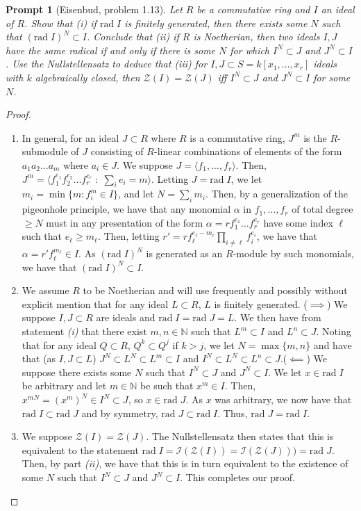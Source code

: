 \documentclass[english]{article}
\newcommand{\NN}{\mathbb{N}}
\newcommand{\prob}[1]{\setcounter{section}{#1-1}\section{}}
\newcommand{\prt}[1]{\setcounter{subsection}{#1-1}\subsection{}}
\newtheorem*{prompt*}{Prompt}
\theoremstyle{remark}
\theoremstyle{definition}
\newcommand{\rad}{\mathrm{rad}\;}
\newcommand{\gen}[1]{\langle #1 \rangle}
\newcommand{\genb}[2]{\langle #1\;:\;#2 \rangle}
\newcommand{\Ii}{\mathcal{I}}
\newcommand{\Zz}{\mathcal{Z}}
\begin{document}
\begin{prompt*}[Eisenbud, problem 1.13]
	Let $R$ be a commutative ring and $I$ an ideal of $R$. Show that \emph{(i)} if $\rad I$ is finitely generated, then there exists some $N$ such that $(\rad I)^N\subset I$. Conclude that \emph{(ii)} if $R$ is Noetherian, then two ideals $I, J$ have the same radical if and only if there is some $N$ for which $I^N\subset J$ and $J^N\subset I$. Use the Nullstellensatz to deduce that \emph{(iii)} for $I,J\subset S=k[x_1,\hdots,x_r]$ ideals with $k$ algebraically closed, then $\Zz(I)=\Zz(J)$ iff $I^N\subset J$ and $J^N\subset I$ for some $N$.\end{prompt*}
\begin{proof}
	\begin{enumerate}[label=\emph{(\roman*)}]
		\item In general, for an ideal $J\subset R$ where $R$ is a commutative ring, $J^m$ is the $R$-submodule of $J$ consisting of $R$-linear combinations of elements of the form $a_1a_2\hdots a_m$ where $a_i\in J$. We suppose $J=\gen{f_1,\hdots,f_r}$. Then, $J^m=\genb{f_1^{e_1}f_2^{e_2}\hdots f_r^{e_r}}{\sum_i e_i=m}$. Letting $J=\rad I$, we let $m_i= \min\{m:f_i^m\in I\}$, and let $N=\sum_i m_i$. Then, by a generalization of the pigeonhole principle, we have that any monomial $\alpha$ in $f_1,\hdots,f_r$ of total degree $\geq N$ must in any presentation of the form $\alpha=rf_1^{e_1}\hdots f_r^{e_r}$ have some index $\ell$ such that $e_\ell\geq m_\ell$. Then, letting $r'=rf_\ell^{e_\ell-m_\ell}\prod_{i\neq \ell} f_i^{e_i}$, we have that $\alpha=r'f_\ell^{m_{\ell}}\in I$. As $(\rad I)^N $ is generated as an $R$-module by such monomials, we have that $(\rad I)^N\subset I$.
		\item We assume $R$ to be Noetherian and will use frequently and possibly without explicit mention that for any ideal $L\subset R$, $L$ is finitely generated. \newline ($\implies$) We suppose $I,J\subset R$ are ideals and $\rad I=\rad J=L$. We then have from statement \emph{(i)} that there exist $m,n\in \NN$ such that $L^m\subset I$ and $L^n\subset J$. Noting that for any ideal $Q\subset R$, $Q^k\subset Q^j$ if $k>j$, we let $N=\max\{m,n\}$ and have that (as $I,J\subset L$) $J^N\subset L^N\subset L^m\subset I$ and $I^N\subset L^N\subset L^n\subset J$.\newline ($\impliedby$) We suppose there exists some $N$ such that $I^N\subset J$ and $J^N\subset I$. We let $x\in \rad I$ be arbitrary and let $m\in \NN$ be such that $x^m\in I$. Then, $x^{mN}=(x^m)^N\in I^N\subset J$, so  $x\in \rad J$. As $x$ was arbitrary, we now have that $\rad I\subset \rad J$ and by symmetry, $\rad J\subset \rad I$. Thus, $\rad J=\rad I$. 
		\item We suppose $\Zz(I)=\Zz(J)$. The Nullstellensatz then states that this is equivalent to the statement $\rad I=\Ii(\Zz(I))=\Ii(\Zz(J)))=\rad J$. Then, by part \emph{(ii)}, we have that this is in turn equivalent to the existence of some $N$ such that $I^N\subset J$ and $J^N\subset I$. This completes our proof.
	\end{enumerate}
	\end{proof}
%
%
\prob{3}
\prt{2}
\end{document}
